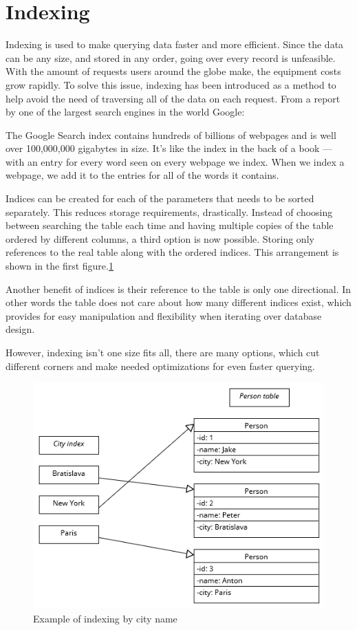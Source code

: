 \documentclass[10pt,twoside,a4paper]{article}
\begin{document}
\section{Indexing}
Indexing is used to make querying data faster and more efficient. Since the data can be any size,
and stored in any order, going over every record is unfeasible. With the amount of requests users around the globe make, the equipment costs grow rapidly. To solve this issue, indexing has been introduced as a method to help avoid the need of traversing all of the data on each request. From a report by one of the largest search engines in the world Google\cite{Google}:
\begin{displayquote}
The Google Search index contains hundreds of billions of webpages and is well over 100,000,000 gigabytes in size. It’s like the index in the back of a book — with an entry for every word seen on every webpage we index. When we index a webpage, we add it to the entries for all of the words it contains.
\end{displayquote}

Indices can be created for each of the parameters that needs to be sorted separately. This reduces storage requirements, drastically. Instead of choosing between searching the table each time and having multiple copies of the table ordered by different columns, a third option is now possible. Storing only references to the real table along with the ordered indices. This arrangement is shown in the first figure.\ref{fig:index-city}

Another benefit of indices is their reference to the table is only one directional. In other words the table does not care about how many different indices exist, which provides for easy manipulation and flexibility when iterating over database design.

However, indexing isn't one size fits all, there are many options, which cut different corners and make needed optimizations for even faster querying.
\cite{10.1007/978-3-319-93803-5_1}

\begin{figure}
    \centering
    \includegraphics[width=1\linewidth]{Indexing.png}
    \caption{Example of indexing by city name}
    \label{fig:index-city}
\end{figure}
\end{document}

